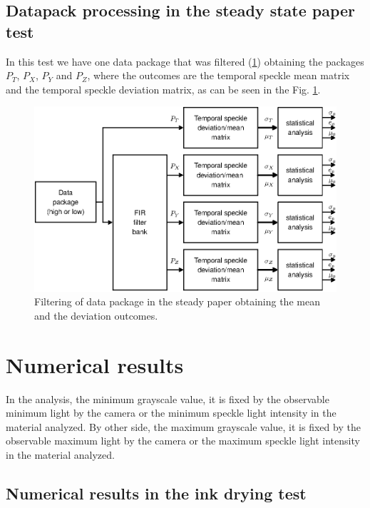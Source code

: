 \documentclass[review]{elsarticle}
\begin{document}
\subsection{Datapack processing in the steady state paper test}
\label{subsec:numprocink}

In this test we have one data package that was filtered (\ref{fig:filtering2}) obtaining the packages $P_T$, $P_X$, $P_Y$ and $P_Z$, where the outcomes are the temporal speckle mean matrix and the 
temporal speckle deviation matrix, as can be seen in the Fig. \ref{fig:filtering2}.

\begin{figure}[h!]
\centering
\includegraphics[width=0.65\columnwidth]{filtering2.eps}
\caption{Filtering of data package in the steady paper obtaining the mean and the deviation outcomes.}
\label{fig:filtering2}
\end{figure}




\section{Numerical results} 
\label{sec:numerical}


In the analysis, the minimum grayscale value, 
it is fixed by the observable minimum light by the camera or the minimum speckle light intensity in the material analyzed.
By other side, the maximum grayscale value, 
it is fixed by the observable maximum light by the camera or the maximum speckle light intensity in the material analyzed.

\subsection{Numerical results in the ink drying test} 
\label{subsec:numericalink}
\end{document}
